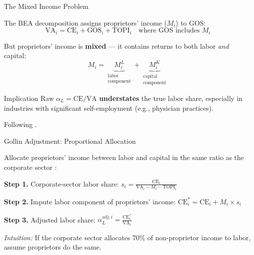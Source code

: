 \begin{frame}{The Mixed Income Problem}

The BEA decomposition assigns proprietors' income ($M_i$) to GOS:
%
\begin{equation*}
    \text{VA}_i = \text{CE}_i + \text{GOS}_i + \text{TOPI}_i
    \quad \text{where GOS includes } M_i
\end{equation*}

But proprietors' income is \textbf{mixed} --- it contains returns to both labor \emph{and} capital:
%
\begin{equation*}
    M_i = \underbrace{M_i^L}_{\substack{\text{labor} \\ \text{component}}} + \underbrace{M_i^K}_{\substack{\text{capital} \\ \text{component}}}
\end{equation*}

\begin{alertblock}{Implication}
Raw $\alpha_L = \text{CE}/\text{VA}$ \textbf{understates} the true labor share, especially in industries with significant self-employment (e.g., physician practices).
\end{alertblock}

{\footnotesize Following \citet{Gollin2002_getting_income}.}

\end{frame}

\begin{frame}{Gollin Adjustment: Proportional Allocation}

Allocate proprietors' income between labor and capital in the same ratio as the corporate sector \citep{Gollin2002_getting_income}:

\smallskip

\textbf{Step 1.} Corporate-sector labor share: \quad
$\displaystyle s_i = \frac{\text{CE}_i}{\text{VA}_i - M_i - \text{TOPI}_i}$

\medskip

\textbf{Step 2.} Impute labor component of proprietors' income: \quad
$\text{CE}_i^* = \text{CE}_i + M_i \times s_i$

\medskip

\textbf{Step 3.} Adjusted labor share: \quad
$\displaystyle \alpha_L^{\text{adj},i} = \frac{\text{CE}_i^*}{\text{VA}_i}$

\smallskip
\textit{Intuition:} If the corporate sector allocates 70\% of non-proprietor income to labor, assume proprietors do the same.

\end{frame}

